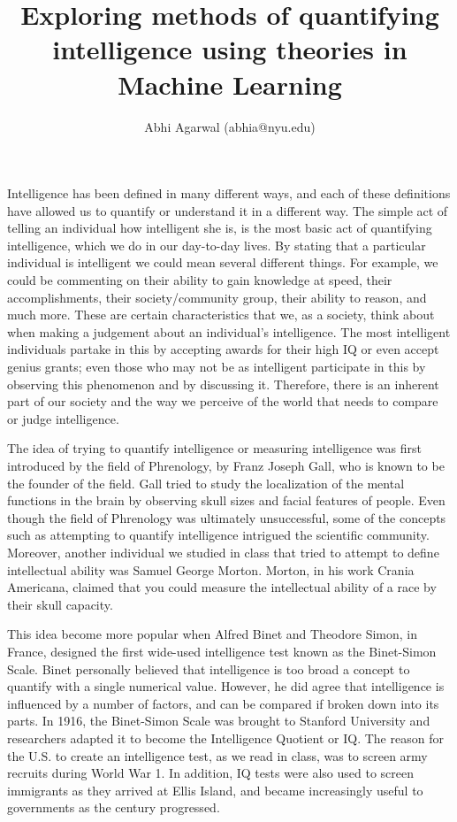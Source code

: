 \documentclass[11pt, oneside]{article}
\title{Exploring methods of quantifying intelligence using theories in Machine Learning}
\author{Abhi Agarwal (abhia@nyu.edu)}
\date{}
\begin{document}
\maketitle

\par Intelligence has been defined in many different ways, and each of these definitions have allowed us to quantify or understand it in a different way. The simple act of telling an individual how intelligent she is, is the most basic act of quantifying intelligence, which we do in our day-to-day lives. By stating that a particular individual is intelligent we could mean several different things. For example, we could be commenting on their ability to gain knowledge at speed, their accomplishments, their society/community group, their ability to reason, and much more. These are certain characteristics that we, as a society, think about when making a judgement about an individual's intelligence. The most intelligent individuals partake in this by accepting awards for their high IQ or even accept genius grants; even those who may not be as intelligent participate in this by observing this phenomenon and by discussing it. Therefore, there is an inherent part of our society and the way we perceive of the world that needs to compare or judge intelligence.

\par The idea of trying to quantify intelligence or measuring intelligence was first introduced by the field of Phrenology, by Franz Joseph Gall, who is known to be the founder of the field. Gall tried to study the localization of the mental functions in the brain by observing skull sizes and facial features of people. Even though the field of Phrenology was ultimately unsuccessful, some of the concepts such as attempting to quantify intelligence intrigued the scientific community. Moreover, another individual we studied in class that tried to attempt to define intellectual ability was Samuel George Morton. Morton, in his work Crania Americana, claimed that you could measure the intellectual ability of a race by their skull capacity. 

\par This idea become more popular when Alfred Binet and Theodore Simon, in France, designed the first wide-used intelligence test known as the Binet-Simon Scale. Binet personally believed that intelligence is too broad a concept to quantify with a single numerical value. However, he did agree that intelligence is influenced by a number of factors, and can be compared if broken down into its parts. In 1916, the Binet-Simon Scale was brought to Stanford University and researchers adapted it to become the Intelligence Quotient or IQ. The reason for the U.S. to create an intelligence test, as we read in class, was to screen army recruits during World War 1. In addition, IQ tests were also used to screen immigrants as they arrived at Ellis Island, and became increasingly useful to governments as the century progressed. 
\end{document}
